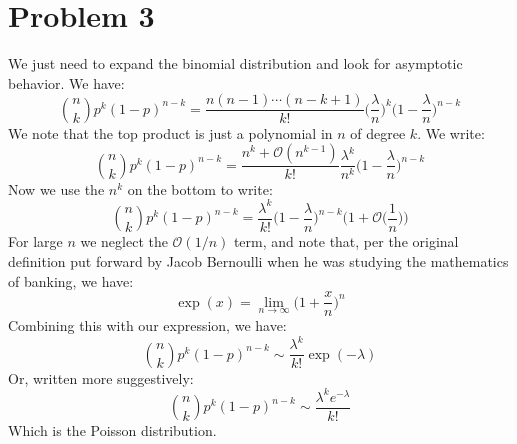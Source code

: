\documentclass{article}
\begin{document}
    \section*{Problem 3}
        We just need to expand the binomial distribution and look for asymptotic behavior.
        We have:
        \begin{equation}
            \binom{n}{k}p^{k}(1-p)^{n-k}
                =\frac{n(n-1)\cdots(n-k+1)}{k!}\Big(\frac{\lambda}{n}\Big)^{k}
                    \Big(1-\frac{\lambda}{n}\Big)^{n-k}
        \end{equation}
        We note that the top product is just a polynomial in $n$ of degree $k$.
        We write:
        \begin{equation}
            \binom{n}{k}p^{k}(1-p)^{n-k}
                =\frac{n^{k}+\mathcal{O}(n^{k-1})}{k!}\frac{\lambda^{k}}{n^{k}}
                    \Big(1-\frac{\lambda}{n}\Big)^{n-k}
        \end{equation}
        Now we use the $n^{k}$ on the bottom to write:
        \begin{equation}
            \binom{n}{k}p^{k}(1-p)^{n-k}
                =\frac{\lambda^{k}}{k!}\Big(1-\frac{\lambda}{n}\Big)^{n-k}
                    \Big(1+\mathcal{O}\big(\frac{1}{n}\big)\Big)
        \end{equation}
        For large $n$ we neglect the $\mathcal{O}(1/n)$ term, and note that, per the
        original definition put forward by Jacob Bernoulli when he was studying the
        mathematics of banking, we have:
        \begin{equation}
            \exp(x)=\lim_{n\rightarrow\infty}\Big(1+\frac{x}{n}\Big)^{n}
        \end{equation}
        Combining this with our expression, we have:
        \begin{equation}
            \binom{n}{k}p^{k}(1-p)^{n-k}\sim\frac{\lambda^{k}}{k!}\exp(-\lambda)
        \end{equation}
        Or, written more suggestively:
        \begin{equation}
            \binom{n}{k}p^{k}(1-p)^{n-k}\sim
                \frac{\lambda^{k}e^{-\lambda}}{k!}
        \end{equation}
        Which is the Poisson distribution.
\end{document}
